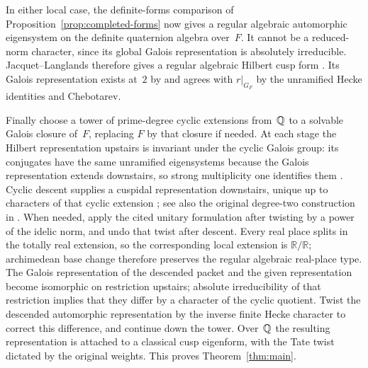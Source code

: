 In either local case, the definite-forms comparison of
Proposition~\ref{prop:completed-forms} now gives a regular algebraic
automorphic eigensystem on the definite quaternion algebra over~$F$.
It cannot be a reduced-norm character, since its global Galois
representation is absolutely irreducible.  Jacquet--Langlands therefore
gives a regular algebraic Hilbert cusp form
\cite[Theorem~14.4]{JacquetLanglands1970}.  Its Galois representation
exists at~$2$ by \cite[Theorem~2.1.1]{BLGGT2014} and agrees with
$r|_{G_F}$ by the unramified Hecke identities and Chebotarev.

Finally choose a tower of prime-degree cyclic extensions from~$\mathbb Q$ to a solvable
Galois closure of~$F$, replacing $F$ by that closure if needed.
At each stage the Hilbert representation upstairs is invariant under
the cyclic Galois group: its conjugates have the same unramified
eigensystems because the Galois representation extends downstairs, so
strong multiplicity one identifies them
\cite[Chapter~3, Lemma~3.1]{Langlands1980}.  Cyclic descent supplies a
cuspidal representation downstairs, unique up to characters of that
cyclic extension
\cite[Chapter~III, Theorems~4.2(d) and~5.1]{ArthurClozel1989}; see also
the original degree-two construction in
\cite[Chapter~11, Lemma~11.3 and Proposition~11.4]{Langlands1980}.
When needed, apply the cited unitary formulation after twisting by a
power of the idelic norm, and undo that twist after descent.  Every
real place splits in the totally real extension, so the corresponding
local extension is $\mathbb R/\mathbb R$; archimedean base change
therefore preserves the regular algebraic real-place type.
The Galois representation of the descended packet and the given
representation become isomorphic on
restriction upstairs; absolute irreducibility of that restriction
implies that they differ by a character of the cyclic quotient.
Twist the descended automorphic representation by the inverse finite
Hecke character to correct this difference, and continue down the
tower.  Over~$\mathbb Q$ the resulting representation is attached to a
classical cusp eigenform, with the Tate twist dictated by the original
weights.  This proves Theorem~\ref{thm:main}.

